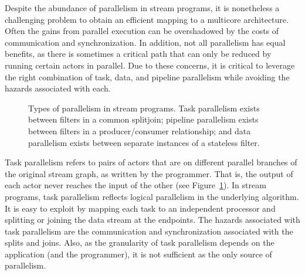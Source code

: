 


Despite the abundance of parallelism in stream programs, it is
nonetheless a challenging problem to obtain an efficient mapping to a
multicore architecture.  Often the gains from parallel execution can
be overshadowed by the costs of communication and synchronization.  In
addition, not all parallelism has equal benefits, as there is
sometimes a critical path that can only be reduced by running certain
actors in parallel.  Due to these concerns, it is critical to leverage
the right combination of task, data, and pipeline parallelism while
avoiding the hazards associated with each.

\begin{figure}[t]
\centering
{}
\caption[Types of parallelism in stream programs]{Types of parallelism
  in stream programs.  Task parallelism exists between filters in a
  common splitjoin; pipeline parallelism exists between filters in a
  producer/consumer relationship; and data parallelism exists between
  separate instances of a stateless
  filter.\protect\label{fig:parallelism}}
\end{figure}

Task parallelism refers to pairs of actors that are on different
parallel branches of the original stream graph, as written by the
programmer.  That is, the output of each actor never reaches the input
of the other (see Figure~\ref{fig:parallelism}).  In stream
programs, task parallelism reflects logical parallelism in the
underlying algorithm.  It is easy to exploit by mapping each task to
an independent processor and splitting or joining the data stream at
the endpoints.  The hazards associated with task parallelism are the
communication and synchronization associated with the splits and
joins.  Also, as the granularity of task parallelism depends on the
application (and the programmer), it is not sufficient as the only
source of parallelism.

